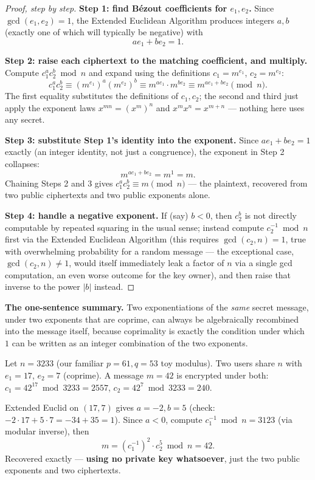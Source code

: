 \begin{proof}[Proof, step by step]
\textbf{Step 1: find Bézout coefficients for $e_1,e_2$.} Since $\gcd(e_1,e_2)=1$, the Extended Euclidean Algorithm produces integers $a,b$ (exactly one of which will typically be negative) with
\[
ae_1+be_2=1.
\]

\textbf{Step 2: raise each ciphertext to the matching coefficient, and multiply.} Compute $c_1^a c_2^b \bmod n$ and expand using the definitions $c_1=m^{e_1}$, $c_2=m^{e_2}$:
\[
c_1^{a}c_2^{b} \equiv (m^{e_1})^a(m^{e_2})^b \equiv m^{ae_1}\cdot m^{be_2} \equiv m^{ae_1+be_2} \pmod n.
\]
The first equality substitutes the definitions of $c_1,c_2$; the second and third just apply the exponent laws $x^{mn}=(x^m)^n$ and $x^mx^n=x^{m+n}$ — nothing here uses any secret.

\textbf{Step 3: substitute Step 1's identity into the exponent.} Since $ae_1+be_2=1$ exactly (an integer identity, not just a congruence), the exponent in Step 2 collapses:
\[
m^{ae_1+be_2} = m^1 = m.
\]
Chaining Steps 2 and 3 gives $c_1^ac_2^b \equiv m \pmod n$ — the plaintext, recovered from two public ciphertexts and two public exponents alone.

\textbf{Step 4: handle a negative exponent.} If (say) $b<0$, then $c_2^b$ is not directly computable by repeated squaring in the usual sense; instead compute $c_2^{-1}\bmod n$ first via the Extended Euclidean Algorithm (this requires $\gcd(c_2,n)=1$, true with overwhelming probability for a random message — the exceptional case, $\gcd(c_2,n)\ne1$, would itself immediately leak a factor of $n$ via a single gcd computation, an even worse outcome for the key owner), and then raise that inverse to the power $|b|$ instead.
\end{proof}

\medskip\noindent\textbf{The one-sentence summary.} Two exponentiations of the \emph{same} secret message, under two exponents that are coprime, can always be algebraically recombined into the message itself, because coprimality is exactly the condition under which $1$ can be written as an integer combination of the two exponents.

\begin{example}
Let $n = 3233$ (our familiar $p=61,q=53$ toy modulus). Two users share $n$ with $e_1 = 17$, $e_2=7$ (coprime). A message $m=42$ is encrypted under both: $c_1 = 42^{17} \bmod 3233 = 2557$, $c_2 = 42^{7} \bmod 3233 = 240$.

Extended Euclid on $(17,7)$ gives $a=-2, b=5$ (check: $-2\cdot17 + 5\cdot7 = -34+35=1$). Since $a<0$, compute $c_1^{-1} \bmod n = 3123$ (via modular inverse), then
\[
m = (c_1^{-1})^{2} \cdot c_2^{5} \bmod n = 42.
\]
Recovered exactly — \textbf{using no private key whatsoever}, just the two public exponents and two ciphertexts.
\end{example}

